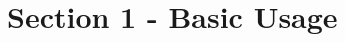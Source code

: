 \documentclass[../../Main.tex]{subfiles}
\begin{document}
\chapter{Section 1 - Basic Usage}




\end{document}
